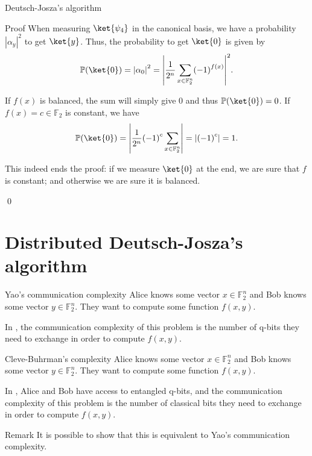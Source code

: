\documentclass[a4paper]{article}
\begin{document}
\begin{parag}{Deutsch-Josza's algorithm}
\begin{subparag}{Proof}
        When measuring $\ket{\psi_4}$ in the canonical basis, we have a probability $\left|\alpha_y\right|^2$ to get $\ket{y}$. Thus, the probability to get $\ket{0}$ is given by 
        \[\prob\left(\ket{0}\right) = \left|\alpha_0\right|^2 = \left|\frac{1}{2^n} \sum_{x \in \mathbb{F}_2^n} \left(-1\right)^{f\left(x\right)}\right|^2.\]
        
        If $f\left(x\right)$ is balanced, the sum will simply give 0 and thus $\prob\left(\ket{0}\right) = 0$. If $f\left(x\right) = c \in \mathbb{F}_2$ is constant, we have 
        \[\prob\left(\ket{0}\right) = \left|\frac{1}{2^n} \left(-1\right)^c \sum_{x \in \mathbb{F}_2^n} \right| = \left|\left(-1\right)^c\right| = 1.\]

        This indeed ends the proof: if we measure $\ket{0}$ at the end, we are sure that $f$ is constant; and otherwise we are sure it is balanced.

        \qed
    \end{subparag}
\end{parag}

\section{Distributed Deutsch-Josza's algorithm}

\begin{parag}{Yao's communication complexity}
    Alice knows some vector $x \in \mathbb{F}_2^n$ and Bob knows some vector $y \in \mathbb{F}_2^n$. They want to compute some function $f\left(x, y\right)$.

    In , the communication complexity of this problem is the number of q-bits they need to exchange in order to compute $f\left(x, y\right)$.
\end{parag}

\begin{parag}{Cleve-Buhrman's complexity}
    Alice knows some vector $x \in \mathbb{F}_2^n$ and Bob knows some vector $y \in \mathbb{F}_2^n$. They want to compute some function $f\left(x, y\right)$.

    In , Alice and Bob have access to entangled q-bits, and the communication complexity of this problem is the number of classical bits they need to exchange in order to compute $f\left(x, y\right)$.

    \begin{subparag}{Remark}
        It is possible to show that this is equivalent to Yao's communication complexity.
    \end{subparag}
\end{parag}
\end{document}
